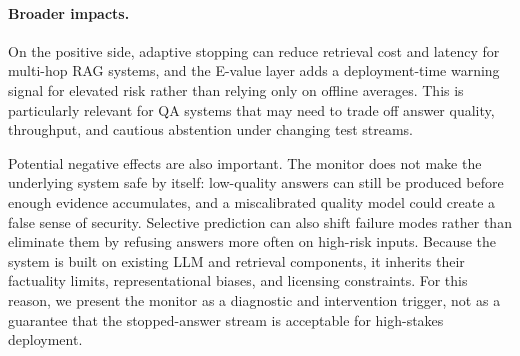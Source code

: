 \documentclass{article}
\begin{document}
\paragraph{Broader impacts.}
On the positive side, adaptive stopping can reduce retrieval cost and latency for multi-hop RAG systems, and the E-value layer adds a deployment-time warning signal for elevated risk rather than relying only on offline averages. This is particularly relevant for QA systems that may need to trade off answer quality, throughput, and cautious abstention under changing test streams.

Potential negative effects are also important. The monitor does not make the underlying system safe by itself: low-quality answers can still be produced before enough evidence accumulates, and a miscalibrated quality model could create a false sense of security. Selective prediction can also shift failure modes rather than eliminate them by refusing answers more often on high-risk inputs. Because the system is built on existing LLM and retrieval components, it inherits their factuality limits, representational biases, and licensing constraints. For this reason, we present the monitor as a diagnostic and intervention trigger, not as a guarantee that the stopped-answer stream is acceptable for high-stakes deployment.
\end{document}
